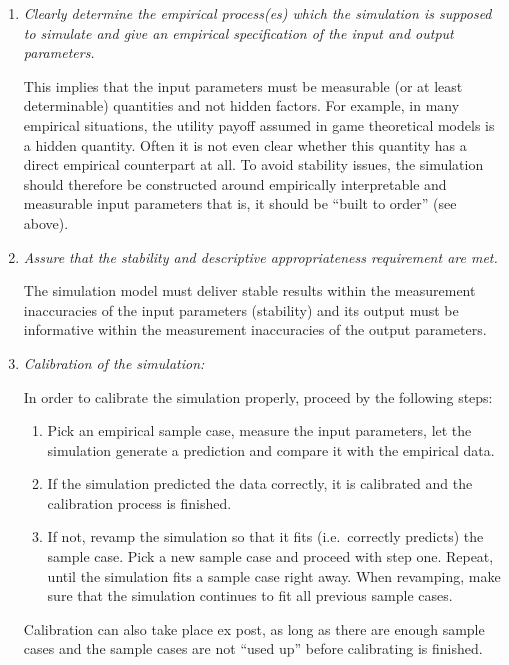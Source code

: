 \begin{enumerate}
\item {\em Clearly determine the empirical process(es) which the simulation is
    supposed to simulate and give an empirical specification of the input and
    output parameters.}

  This implies that the input parameters must be measurable (or at least
  determinable) quantities and not hidden factors. For example, in many
  empirical situations, the utility payoff assumed in game theoretical models
  is a hidden quantity. Often it is not even clear whether this quantity has
  a direct empirical counterpart at all. To avoid stability issues, the simulation should therefore
  be constructed around empirically interpretable and measurable input
  parameters that is, it should be ``built to order'' (see above).

\item {\em Assure that the stability and descriptive appropriateness
    requirement are met.}

  The simulation model must deliver stable results within the measurement
  inaccuracies of the input parameters (stability) and its output must be
  informative within the measurement inaccuracies of the output parameters.

\item {\em Calibration of the simulation:}

  In order to calibrate the simulation properly, proceed by the following
  steps:

\begin{enumerate}
\item Pick an empirical sample case, measure the input parameters, let the
  simulation generate a prediction and compare it with the empirical data.

\item If the simulation predicted the data correctly, it is calibrated and the
  calibration process is finished.

\item If not, revamp the simulation so that it fits (i.e.\ correctly predicts)
  the sample case. Pick a new sample case and proceed with step one. Repeat,
  until the simulation fits a sample case right away. When revamping, make
  sure that the simulation continues to fit all previous sample cases.
\end{enumerate}

Calibration can also take place ex post, as long as there are enough sample
cases and the sample cases are not ``used up'' before calibrating is finished.


\end{enumerate}

